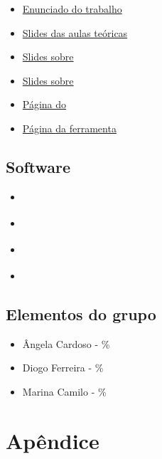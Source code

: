\documentclass[12pt]{report}
\begin{document}
\begin{itemize}
	\item \href{https://paginas.fe.up.pt/~eol/AIAD/1617/trabalhos.html#T05}{Enunciado do trabalho}
	\item \href{https://paginas.fe.up.pt/~eol/AIAD/aiad1617.html}{Slides das aulas teóricas}
	\item \href{https://paginas.fe.up.pt/~eol/AIAD/aulas/jade_en.pdf}{Slides sobre \jade}
	\item \href{https://paginas.fe.up.pt/~eol/AIAD/aulas/REPAST_intro_hlc.pdf}{Slides sobre \repast}
	\item \href{https://web.fe.up.pt/~hlc/doku.php?id=sajas}{Página do \sajas}
	\item \href{https://web.fe.up.pt/~hlc/doku.php?id=massim2dev}{Página da ferramenta \massim}
\end{itemize}

\section{Software}

\begin{itemize}
	\item \href{http://jade.tilab.com}{\jade}
	\item \href{http://repast.sourceforge.net/repast_3/index.html}{\repast}
	\item \href{https://web.fe.up.pt/~hlc/doku.php?id=sajas}{\sajas}
	\item \href{https://web.fe.up.pt/~hlc/doku.php?id=massim2dev}{\massim}
\end{itemize}

\section{Elementos do grupo}
\begin{itemize}
	\item Ângela Cardoso - \%
	\item Diogo Ferreira - \%
	\item Marina Camilo - \%
\end{itemize}

\chapter{Apêndice}

\end{document}
